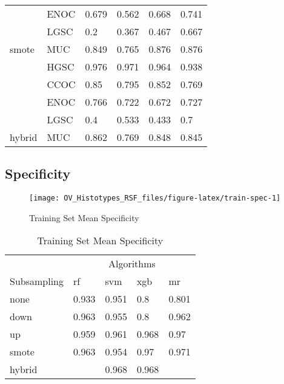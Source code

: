 \documentclass[
]{report}
\begin{document}
\begin{table}
\begin{tabular}[t]{l|l|l|l|l|l}
\cline{2-6}
 & ENOC & 0.679 & 0.562 & 0.668 & 0.741\\
\cline{2-6}
 & LGSC & 0.2 & 0.367 & 0.467 & 0.667\\
\cline{2-6}
\multirow{-5}{*}{\raggedright\arraybackslash smote} & MUC & 0.849 & 0.765 & 0.876 & 0.876\\
\cline{1-6}
 & HGSC & 0.976 & 0.971 & 0.964 & 0.938\\
\cline{2-6}
 & CCOC & 0.85 & 0.795 & 0.852 & 0.769\\
\cline{2-6}
 & ENOC & 0.766 & 0.722 & 0.672 & 0.727\\
\cline{2-6}
 & LGSC & 0.4 & 0.533 & 0.433 & 0.7\\
\cline{2-6}
\multirow{-5}{*}{\raggedright\arraybackslash hybrid} & MUC & 0.862 & 0.769 & 0.848 & 0.845\\
\hline
\end{tabular}
\end{table}

\subsection{Specificity}\label{specificity-1}

\begin{figure}[H]

{\centering \texttt{[image: OV\_Histotypes\_RSF\_files/figure-latex/train-spec-1]} 

}

\caption{Training Set Mean Specificity}\label{fig:train-spec}
\end{figure}

\begin{table}

\caption{\label{tab:train-spec-table}Training Set Mean Specificity}
\centering
\begin{tabular}[t]{l|l|l|l|l}
\hline
\multicolumn{1}{c|}{ } & \multicolumn{4}{c}{Algorithms} \\
\cline{2-5}
Subsampling & rf & svm & xgb & mr\\
\hline
none & 0.933 & 0.951 & 0.8 & 0.801\\
\hline
down & 0.963 & 0.955 & 0.8 & 0.962\\
\hline
up & 0.959 & 0.961 & 0.968 & 0.97\\
\hline
smote & 0.963 & 0.954 & 0.97 & 0.971\\
\hline
hybrid & \cellcolor[HTML]{90ee90}{0.972} & 0.968 & 0.968 & \cellcolor[HTML]{90ee90}{0.972}\\
\hline
\end{tabular}
\end{table}
\end{document}
